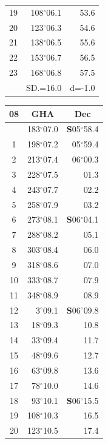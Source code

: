 \documentclass[10pt, a4paper]{report}
\begin{document}
\begin{scriptsize}
\begin{tabular*}{0.2\textwidth}[t]{@{\extracolsep{\fill}}|c|rr|}
19 & 108$^\circ$06.1 & 53.6\\
20 & 123$^\circ$06.3 & 54.6\\
21 & 138$^\circ$06.5 & \raisebox{0.24ex}{\boldmath$\cdot$~\boldmath$\cdot$~~}55.6\\
22 & 153$^\circ$06.7 & 56.5\\
23 & 168$^\circ$06.8 & 57.5\\
\hline
\rule{0pt}{2.4ex} & \multicolumn{1}{c}{SD.=16.0} & \multicolumn{1}{c|}{d=-1.0}\\
\hline
\end{tabular*}\noindent
\begin{tabular*}{0.2\textwidth}[t]{@{\extracolsep{\fill}}|c|rr|}
\hline
\multicolumn{1}{|c|}{\rule{0pt}{2.6ex}\textbf{08}} & \multicolumn{1}{c}{\textbf{GHA}} & \multicolumn{1}{c|}{\textbf{Dec}}\\
\hline\rule{0pt}{2.6ex}\noindent
0 & 183$^\circ$07.0 & \textbf{S}05$^\circ$58.4\\
1 & 198$^\circ$07.2 & 05$^\circ$59.4\\
2 & 213$^\circ$07.4 & 06$^\circ$00.3\\
3 & 228$^\circ$07.5 & \raisebox{0.24ex}{\boldmath$\cdot$~\boldmath$\cdot$~~}01.3\\
4 & 243$^\circ$07.7 & 02.2\\
5 & 258$^\circ$07.9 & 03.2\\[2Pt]
6 & 273$^\circ$08.1 & \textbf{S}06$^\circ$04.1\\
7 & 288$^\circ$08.2 & 05.1\\
8 & 303$^\circ$08.4 & 06.0\\
9 & 318$^\circ$08.6 & \raisebox{0.24ex}{\boldmath$\cdot$~\boldmath$\cdot$~~}07.0\\
10 & 333$^\circ$08.7 & 07.9\\
11 & 348$^\circ$08.9 & 08.9\\[2Pt]
12 & 3$^\circ$09.1 & \textbf{S}06$^\circ$09.8\\
13 & 18$^\circ$09.3 & 10.8\\
14 & 33$^\circ$09.4 & 11.7\\
15 & 48$^\circ$09.6 & \raisebox{0.24ex}{\boldmath$\cdot$~\boldmath$\cdot$~~}12.7\\
16 & 63$^\circ$09.8 & 13.6\\
17 & 78$^\circ$10.0 & 14.6\\[2Pt]
18 & 93$^\circ$10.1 & \textbf{S}06$^\circ$15.5\\
19 & 108$^\circ$10.3 & 16.5\\
20 & 123$^\circ$10.5 & 17.4\\

\end{tabular*}
\end{scriptsize}
\end{document}
